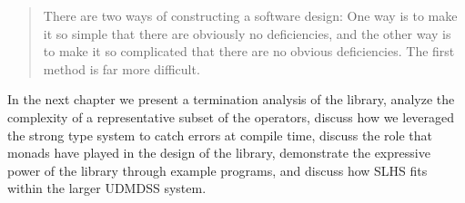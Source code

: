 \documentclass[thesis.tex]{subfiles}
\begin{document}
\begin{quote}
There are two ways of constructing a software design: One way is to make it so simple that there are
obviously no deficiencies, and the other way is to make it so complicated that there are no obvious
deficiencies. The first method is far more difficult.
\end{quote}

In the next chapter we present a termination
analysis of the library, analyze the complexity of a representative subset of the operators, discuss
how we leveraged the strong type system to catch errors at compile time, discuss the role that monads have played in the design of the library,
demonstrate the expressive power of the library through example programs, and discuss how SLHS fits within the larger UDMDSS system.
\end{document}
